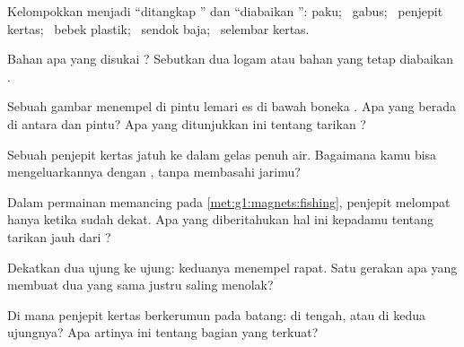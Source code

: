 \begin{exercise}[$\star$]\label{exo:g1:magnets:1}
Kelompokkan menjadi ``ditangkap '' dan ``diabaikan '':
paku; \ gabus; \ penjepit kertas; \ bebek plastik; \ sendok baja; \ selembar
kertas.
\end{exercise}

\begin{exercise}[$\star$]\label{exo:g1:magnets:2}
Bahan apa yang disukai ? Sebutkan dua logam atau bahan yang
tetap diabaikan .
\end{exercise}

\begin{exercise}[$\star$]\label{exo:g1:magnets:3}
Sebuah gambar menempel di pintu lemari es di bawah boneka . Apa
yang berada di antara  dan pintu? Apa yang ditunjukkan ini
tentang tarikan ?
\end{exercise}

\begin{exercise}[$\star$]\label{exo:g1:magnets:4}
Sebuah penjepit kertas jatuh ke dalam gelas penuh air. Bagaimana kamu
bisa mengeluarkannya dengan , tanpa membasahi jarimu?
\end{exercise}

\begin{exercise}[$\star$]\label{exo:g1:magnets:5}
Dalam permainan memancing pada \cref{met:g1:magnets:fishing}, penjepit
melompat hanya ketika  sudah dekat. Apa yang diberitahukan hal
ini kepadamu tentang tarikan jauh dari ?
\end{exercise}

\begin{exercise}[$\star$]\label{exo:g1:magnets:6}
Dekatkan dua  ujung ke ujung: keduanya menempel rapat. Satu
gerakan apa yang membuat dua  yang sama justru saling menolak?
\end{exercise}

\begin{exercise}[$\star$]\label{exo:g1:magnets:7}
Di mana penjepit kertas berkerumun pada  batang: di tengah, atau
di kedua ujungnya? Apa artinya ini tentang bagian  yang terkuat?
\end{exercise}


